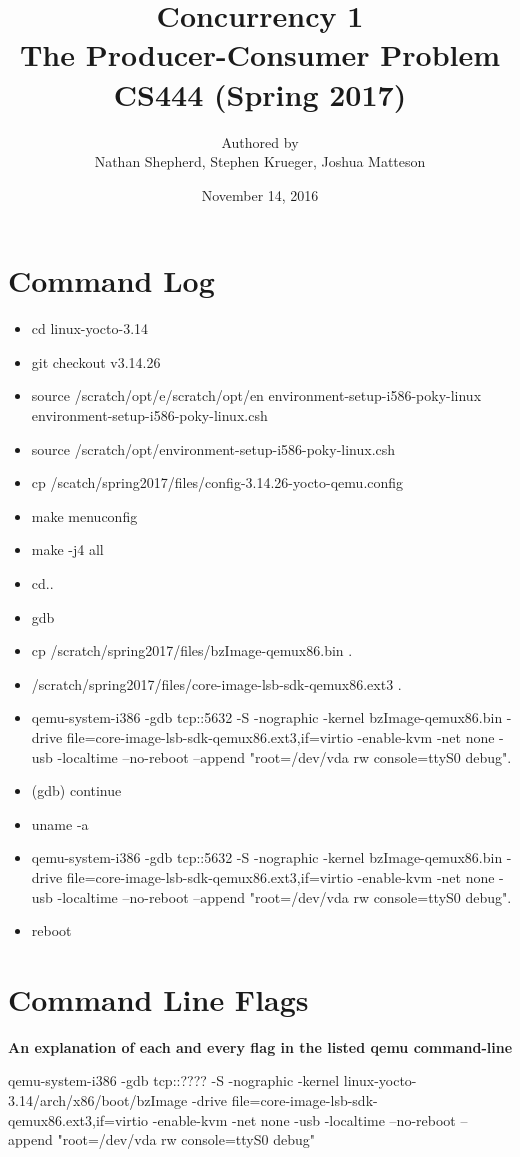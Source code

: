 \documentclass[letterpaper,10pt,titlepage, onecolumn, compsoc]{IEEEtran}
\title{Concurrency 1 \\The Producer-Consumer Problem \\ \vspace{2mm}\small CS444 (Spring 2017)}
\author{Authored by \\ Nathan Shepherd, Stephen Krueger, Joshua Matteson }
\date{November 14, 2016}
\begin{document}
\maketitle
\newpage


\section{Command Log}
\begin{itemize}
\item cd linux-yocto-3.14
\item git checkout v3.14.26
\item source /scratch/opt/e/scratch/opt/en environment-setup-i586-poky-linux environment-setup-i586-poky-linux.csh
\item source /scratch/opt/environment-setup-i586-poky-linux.csh
\item cp /scatch/spring2017/files/config-3.14.26-yocto-qemu.config
\item make menuconfig
\item make -j4 all
\item cd.. 
\item gdb
\item cp /scratch/spring2017/files/bzImage-qemux86.bin .
\item /scratch/spring2017/files/core-image-lsb-sdk-qemux86.ext3 .
\item qemu-system-i386 -gdb tcp::5632 -S -nographic -kernel bzImage-qemux86.bin -drive file=core-image-lsb-sdk-qemux86.ext3,if=virtio -enable-kvm -net none -usb -localtime --no-reboot --append "root=/dev/vda rw console=ttyS0 debug".
\item (gdb) continue
\item uname -a
\item qemu-system-i386 -gdb tcp::5632 -S -nographic -kernel bzImage-qemux86.bin -drive file=core-image-lsb-sdk-qemux86.ext3,if=virtio -enable-kvm -net none -usb -localtime --no-reboot --append "root=/dev/vda rw console=ttyS0 debug".
\item reboot
\end{itemize}
\section{Command Line Flags}
\textbf{An explanation of each and every flag in the listed qemu command-line}

qemu-system-i386 -gdb tcp::???? -S -nographic -kernel linux-yocto-3.14/arch/x86/boot/bzImage -drive file=core-image-lsb-sdk-qemux86.ext3,if=virtio -enable-kvm -net none -usb -localtime --no-reboot --append "root=/dev/vda rw console=ttyS0 debug"
\end{document}
